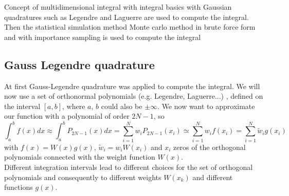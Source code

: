 \documentclass[9pt,a4paper,titlepage]{article}
\begin{document}
Concept of multidimensional integral with integral basics\cite{book1} with Gaussian quadratures such as Legendre and Laguerre are used to compute the integral.
Then the statistical simulation method Monte carlo method in brute force form and with importance sampling  is used to compute the integral
\subsection{Gauss Legendre quadrature}

At first  Gauss-Legendre quadrature\cite{book2} was applied to compute the integral. We will now use a set of orthonormal polynomials \cite{book2}\cite{book3} (e.g. Legendre, Laguerre...) , defined on the interval $[a,b]$, where $a$, $b$ could also be $\pm \infty$. We now want to approximate our function with a polynomial of order $2N-1$, so
\begin{equation} 
\int_{a}^{b}f(x)dx \approx \int_{a}^{b}P_{2N-1}(x)dx = \sum_{i=1}^{N} w_i P_{2N-1}(x_i) \simeq \sum_{i=1}^{N} w_i f(x_i)=\sum_{i=1}^{N} \tilde{w}_i g(x_i)
\end{equation}
with $f(x)=W(x)g(x)$, $\tilde{w}_i =w_i W(x_i)$ and $x_i$ zeros of the orthogonal polynomials connected with the weight function $W(x)$.
\\Different integration intervals lead to different choices for the set of orthogonal polynomials and consequently to different weights $W(x_{k})$ and different functions $g(x)$.
\end{document}
